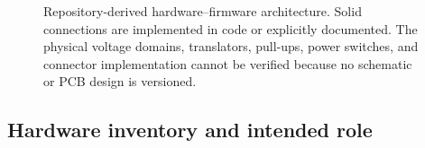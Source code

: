 \documentclass[11pt,a4paper]{article}
\begin{document}
\begin{figure}[H]
{}
\caption{Repository-derived hardware--firmware architecture. Solid connections are implemented in code or explicitly documented. The physical voltage domains, translators, pull-ups, power switches, and connector implementation cannot be verified because no schematic or PCB design is versioned.}
\label{fig:architecture}
\end{figure}

\subsection{Hardware inventory and intended role}
\end{document}
